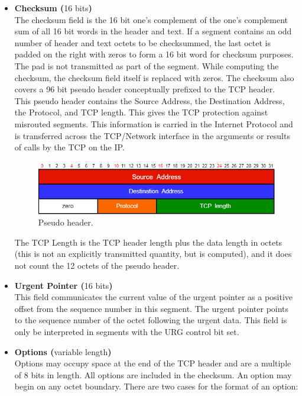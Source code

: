 \begin{itemize}
\item{\textbf{Checksum (}16 bits\textbf{)}\\
The checksum field is the 16 bit one's complement of the one's complement sum of all 16 bit words in the header and text.  If a segment contains an odd number of header and text octets to be checksummed, the last octet is padded on the right with zeros to form a 16 bit word for checksum purposes.\\
The pad is not transmitted as part of the segment.  While computing the checksum, the checksum field itself is replaced with zeros. The checksum also covers a 96 bit pseudo header conceptually prefixed to the TCP header.\\
This pseudo header contains the Source Address, the Destination Address, the Protocol, and TCP length. This gives the TCP protection against misrouted segments.  This information is carried in the Internet Protocol and is transferred across the TCP/Network interface in the arguments or results of calls by the TCP on the IP.\\
\begin{figure}[H]
\centering\footnotesize
\includegraphics[scale=0.6]{Images/Transport/TCP_pseudo_header}
\caption{Pseudo header.}
\end{figure}
The TCP Length is the TCP header length plus the data length in octets (this is not an explicitly transmitted quantity, but is computed), and it does not count the 12 octets of the pseudo header.}
\item{\textbf{Urgent Pointer (}16 bits\textbf{)}\\
This field communicates the current value of the urgent pointer as a positive offset from the sequence number in this segment.  The urgent pointer points to the sequence number of the octet following the urgent data.  This field is only be interpreted in segments with the URG control bit set.}
\item{\textbf{Options (}variable length\textbf{)}\\
Options may occupy space at the end of the TCP header and are a multiple of 8 bits in length. All options are included in the checksum. An option may begin on any octet boundary. There are two cases for the format of an option:
}
\end{itemize}
